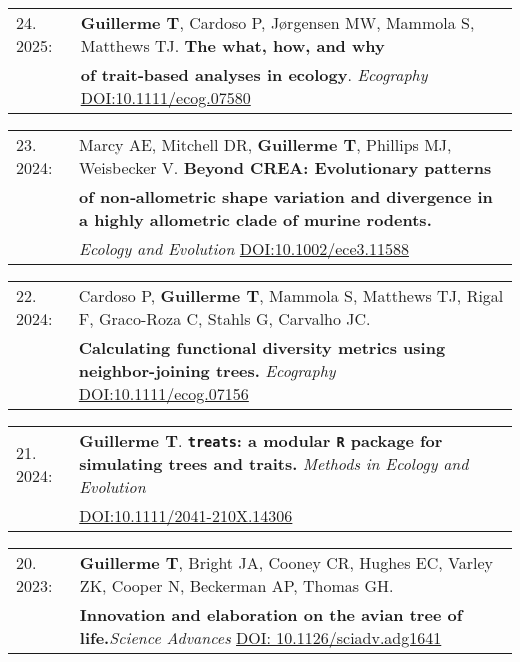 \documentclass[10pt,a4paper]{article}
\begin{document}
{\begin{tabular}{ll}
24. 2025: & \textbf{Guillerme T}, Cardoso P, J\o rgensen MW, Mammola S, Matthews TJ. \textbf{The what, how, and why} \\ 
         & \textbf{of trait‐based analyses in ecology}. \textit{Ecography} \href{https://nsojournals.onlinelibrary.wiley.com/doi/full/10.1111/ecog.07580}{DOI:10.1111/ecog.07580}\\
\end{tabular}
\bigskip

\begin{tabular}{ll}
23. 2024: & Marcy AE, Mitchell DR, \textbf{Guillerme T}, Phillips MJ, Weisbecker V. \textbf{Beyond CREA: Evolutionary patterns}\\
 &  \textbf{of non‐allometric shape variation and divergence in a highly allometric clade of murine rodents.} \\ 
 & \textit{Ecology and Evolution} \href{https://onlinelibrary.wiley.com/doi/full/10.1002/ece3.11588}{DOI:10.1002/ece3.11588} \\
\end{tabular}
\bigskip

\begin{tabular}{ll}
22. 2024: & Cardoso P, \textbf{Guillerme T}, Mammola S, Matthews TJ, Rigal F, Graco-Roza C, Stahls G, Carvalho JC.\\
      & \textbf{Calculating functional diversity metrics using neighbor-joining trees.} \textit{Ecography} \href{https://nsojournals.onlinelibrary.wiley.com/doi/10.1111/ecog.07156}{DOI:10.1111/ecog.07156}\\
\end{tabular}
\bigskip

\begin{tabular}{ll}
21. 2024: &\textbf{Guillerme T}. \textbf{\texttt{treats}: a modular \texttt{R} package for simulating trees and traits.} \textit{Methods in Ecology and Evolution}\\
      &    \href{https://doi.org/10.1111/2041-210X.14306}{DOI:10.1111/2041-210X.14306}\\
\end{tabular}
\bigskip

\begin{tabular}{ll}
20. 2023: &\textbf{Guillerme T}, Bright JA, Cooney CR, Hughes EC, Varley ZK, Cooper N, Beckerman AP, Thomas GH.\\
      & \textbf{Innovation and elaboration on the avian tree of life.}\textit{Science Advances} \href{https://www.science.org/doi/10.1126/sciadv.adg1641}{DOI: 10.1126/sciadv.adg1641}\\
\end{tabular}
\bigskip

}
\end{document}
